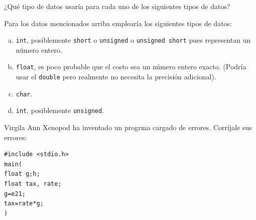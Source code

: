 \documentclass[spanish,addpoints,answers,a4paper]{exam}
\begin{document}
\begin{questions}

\question ¿Qué tipo de datos usaría para cada uno de los siguientes tipos de datos?


\begin{solution}
Para los datos mencionados arriba emplearía los siguientes tipos de datos:
\begin{enumerate}[(a)]
	\item \texttt{int}, posiblemente \texttt{short} o \texttt{unsigned} o \texttt{unsigned short} pues representan un número entero.
	
	\item \texttt{float}, es poco probable que el costo sea un número entero exacto. (Podría usar el \texttt{double} pero realmente no necesita la precisión adicional).
	
	\item \texttt{char}.
	
	\item \texttt{int}, posiblemente \texttt{unsigned}.
\end{enumerate}
\end{solution}

\question Virgila Ann Xenopod ha inventado un progrma cargado de errores. Corríjale sus errores:

\begin{verbatim}
#include <stdio.h>
main(
float g;h;
float tax, rate;
g=e21;
tax=rate*g;
)
\end{verbatim}


\end{questions}
\end{document}
